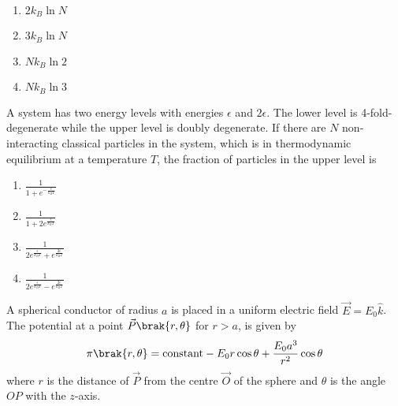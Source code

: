 \begin{multicols}{4}
    \begin{enumerate}
        \item $2k_B \ln N$
        \item $3k_B \ln N$
        \item $Nk_B \ln 2$
        \item $Nk_B \ln 3$
    \end{enumerate}
\end{multicols}
\item A system has two energy levels with energies $\epsilon$ and $2\epsilon$. The lower level is 4-fold-degenerate while the upper level is doubly degenerate. If there are $N$ non-interacting classical particles in the system, which is in thermodynamic equilibrium at a temperature $T$, the fraction of particles in the upper level is
\begin{multicols}{2}
    \begin{enumerate}
        \item $\frac{1}{1+e^{-\frac{\epsilon}{k_BT}}}$
        \item $\frac{1}{1+2e^{\frac{\epsilon}{k_BT}}}$
        \item $\frac{1}{2e^{\frac{\epsilon}{k_BT}}+e^{\frac{2\epsilon}{k_BT}}}$
        \item $\frac{1}{2e^{\frac{\epsilon}{k_BT}}-e^{\frac{2\epsilon}{k_BT}}}$
    \end{enumerate}
\end{multicols}
\item A spherical conductor of radius $a$ is placed in a uniform electric field $\vec{E}=E_0\hat{k}$. The potential at a point $\vec{P}\brak{r,\theta}$ for $ r>a $, is given by
\begin{align*}
	\pi \brak{r,\theta}=\text{constant}-E_0r\cos\theta +\frac{E_0a^3}{r^2}\cos\theta
\end{align*}
where $r$ is the distance of $\vec{P}$ from the centre $\vec{O}$ of the sphere and $\theta$ is the angle $OP$ with the $z$-axis.\\
